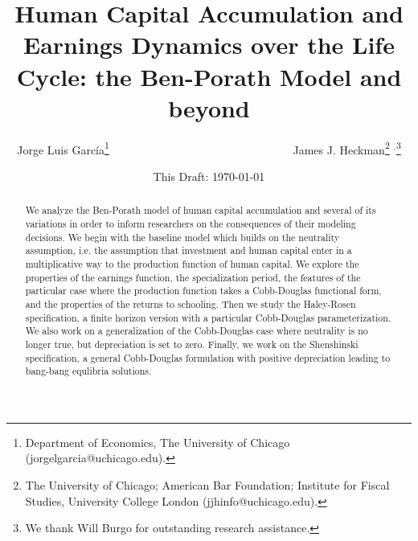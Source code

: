 


\title{Human Capital Accumulation and Earnings Dynamics over the Life Cycle: the Ben-Porath Model and beyond}
\author{Jorge Luis Garc\'{i}a\thanks{Department of Economics, The University of Chicago (jorgelgarcia@uchicago.edu).} \ \ \ \ \ \ \ \ \ \ \ \ \ \ \ \ \ \ \ \ \ \ \
 \ \ \ \ \ \ \ \ \ James J. Heckman\thanks{The University of Chicago; American Bar Foundation; Institute for Fiscal Studies, University College London (jjhinfo@uchicago.edu).} $^{,}$\thanks{We thank  Will Burgo for outstanding research assistance.}}
\date{This Draft: \today}
\maketitle


\begin{abstract}
\noindent We analyze the Ben-Porath model of human capital accumulation and several of its variations in order to inform researchers on the consequences of their modeling decisions. We begin with the baseline model which builds on the neutrality assumption, i.e. the assumption that investment and human capital enter in a multiplicative way to the production function of human capital. We explore the properties of the earnings function, the specialization period, the features of the particular case where the production function takes a Cobb-Douglas functional form, and the properties of the returns to schooling. Then we study the Haley-Rosen specification, a finite horizon version with a particular Cobb-Douglas parameterization. We also work on a generalization of the Cobb-Douglas case where neutrality is no longer true, but depreciation is set to zero. Finally, we work on the Shenshinski specification, a general Cobb-Douglas formulation with positive depreciation leading to bang-bang equlibria solutions.
\end{abstract}



 



\thispagestyle{empty}
\pagestyle{empty}

\setcounter{section}{0} \renewcommand{\thesection}{Appendix \arabic{section}}
\clearpage
\setcounter{figure}{0}  \renewcommand{\thefigure}{A1.\arabic{figure}}
\setcounter{table}{0}   \renewcommand{\thetable}{A1.\arabic{table}}
\setcounter{equation}{0}







